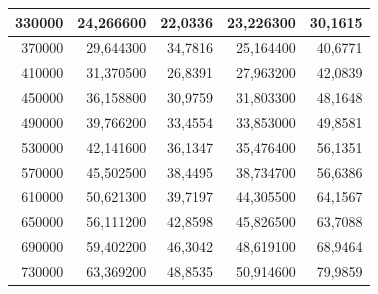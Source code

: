 \documentclass[a4paper, 12pt]{article}
\begin{document}
\begin{longtable}[c]{@{}rrrrr@{}}
	\multicolumn{1}{|r|}{330000}                  & \multicolumn{1}{r|}{24,266600}     & \multicolumn{1}{r|}{22,0336}       & \multicolumn{1}{r|}{23,226300}     & \multicolumn{1}{r|}{30,1615}       \\* \midrule
	\multicolumn{1}{|r|}{370000}                  & \multicolumn{1}{r|}{29,644300}     & \multicolumn{1}{r|}{34,7816}       & \multicolumn{1}{r|}{25,164400}     & \multicolumn{1}{r|}{40,6771}       \\* \midrule
	\multicolumn{1}{|r|}{410000}                  & \multicolumn{1}{r|}{31,370500}     & \multicolumn{1}{r|}{26,8391}       & \multicolumn{1}{r|}{27,963200}     & \multicolumn{1}{r|}{42,0839}       \\* \midrule
	\multicolumn{1}{|r|}{450000}                  & \multicolumn{1}{r|}{36,158800}     & \multicolumn{1}{r|}{30,9759}       & \multicolumn{1}{r|}{31,803300}     & \multicolumn{1}{r|}{48,1648}       \\* \midrule
	\multicolumn{1}{|r|}{490000}                  & \multicolumn{1}{r|}{39,766200}     & \multicolumn{1}{r|}{33,4554}       & \multicolumn{1}{r|}{33,853000}     & \multicolumn{1}{r|}{49,8581}       \\* \midrule
	\multicolumn{1}{|r|}{530000}                  & \multicolumn{1}{r|}{42,141600}     & \multicolumn{1}{r|}{36,1347}       & \multicolumn{1}{r|}{35,476400}     & \multicolumn{1}{r|}{56,1351}       \\* \midrule
	\multicolumn{1}{|r|}{570000}                  & \multicolumn{1}{r|}{45,502500}     & \multicolumn{1}{r|}{38,4495}       & \multicolumn{1}{r|}{38,734700}     & \multicolumn{1}{r|}{56,6386}       \\* \midrule
	\multicolumn{1}{|r|}{610000}                  & \multicolumn{1}{r|}{50,621300}     & \multicolumn{1}{r|}{39,7197}       & \multicolumn{1}{r|}{44,305500}     & \multicolumn{1}{r|}{64,1567}       \\* \midrule
	\multicolumn{1}{|r|}{650000}                  & \multicolumn{1}{r|}{56,111200}     & \multicolumn{1}{r|}{42,8598}       & \multicolumn{1}{r|}{45,826500}     & \multicolumn{1}{r|}{63,7088}       \\* \midrule
	\multicolumn{1}{|r|}{690000}                  & \multicolumn{1}{r|}{59,402200}     & \multicolumn{1}{r|}{46,3042}       & \multicolumn{1}{r|}{48,619100}     & \multicolumn{1}{r|}{68,9464}       \\* \midrule
	\multicolumn{1}{|r|}{730000}                  & \multicolumn{1}{r|}{63,369200}     & \multicolumn{1}{r|}{48,8535}       & \multicolumn{1}{r|}{50,914600}     & \multicolumn{1}{r|}{79,9859}       \\* \midrule

\end{longtable}
\end{document}
